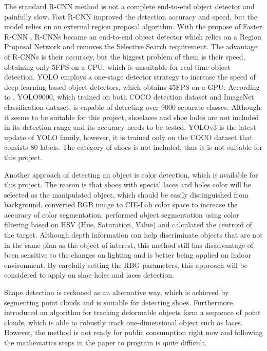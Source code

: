 The standard R-CNN method is not a complete end-to-end object detector and painfully slow. Fast R-CNN \citep{FastRCNN} improved the detection accuracy and speed, but the model relies on an external region proposal algorithm. With the propose of Faster R-CNN \citep{FasterRCNN}, R-CNNs became an end-to-end object detector which relies on a Region Proposal Network and removes the Selective Search requirement. The advantage of R-CNNs is their accuracy, but the biggest problem of them is their speed, obtaining only 5FPS on a CPU, which is unsuitable for real-time object detection. YOLO employs a one-stage detector strategy to increase the speed of deep learning based object detectors, which obtains 45FPS on a GPU. According to \citep{YOLO9000}, YOLO9000, which trained on both COCO detection dataset and ImageNet classification dataset, is capable of detecting over 9000 separate classes. Although it seems to be suitable for this project, shoelaces and shoe holes are not included in its detection range and its accuracy needs to be tested. YOLOv3 \citep{YOLOv3} is the latest update of YOLO family, however, it is trained only on the COCO dataset that consists 80 labels. The category of shoes is not included, thus it is not suitable for this project. 

Another approach of detecting an object is color detection, which is available for this project. The reason is that shoes with special laces and holes color will be selected as the manipulated object, which should be easily distinguished from background. \citep{cie} converted RGB image to CIE-Lab color space to increase the accuracy of color segmentation. \citep{HSV} performed object segmentation using color filtering based on HSV (Hue, Saturation, Value) and calculated the centroid of the target. Although depth information can help discriminate objects that are not in the same plan as the object of interest, this method still has disadvantage of been sensitive to the changes on lighting and is better being applied on indoor environment. By carefully setting the RBG parameters, this approach will be considered to apply on shoe holes and laces detection.

Shape detection is reckoned as an alternative way, which is achieved by segmenting point clouds and is suitable for detecting shoes. Furthermore, \citep{deformable_track} introduced an algorithm for tracking deformable objects form a sequence of point clouds, which is able to robustly track one-dimensional object such as laces. However, the method is not ready for public consumption right now and following the mathematics steps in the paper to program is quite difficult. 

